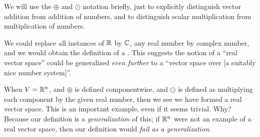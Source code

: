 \begin{remark}
We will use the $\oplus$ and $\odot$ notation briefly, just to
explicitly distinguish vector addition from addition of numbers, and to
distinguish scalar multiplication from multiplication of numbers.
\end{remark}

\begin{remark}
We could replace all instances of $\mathbb{R}$ by $\mathbb{C}$, any real number by
complex number, and we would obtain the definition of a .
This suggests the notion of a ``real vector space'' could be generalized
\emph{even further} to a ``vector space over [a suitably nice number system]''.
\end{remark}

\begin{example}
When $V=\mathbb{R}^{n}$, and $\oplus$ is defined componentwise, and $\odot$ is
defined as multiplying each component by the given real number, then we
see we have formed a real vector space. This is an important example,
even if it seems trivial. Why? Because our definition is a
\emph{generalization} of this; if $\mathbb{R}^{n}$ were not an example of a
real vector space, then our definition would \emph{fail as a generalization}.
\end{example}

